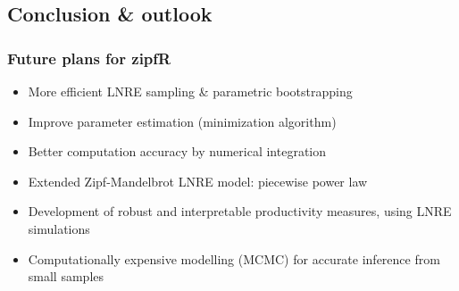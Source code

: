 \documentclass[t]{beamer} %
\begin{document}
\subsection{Conclusion \& outlook}

\begin{frame}
  \frametitle{Future plans for zipfR}

  \begin{itemize}
  \item More efficient LNRE sampling \& parametric bootstrapping
  \item Improve parameter estimation (minimization algorithm)
  \item Better computation accuracy by numerical integration
  \item Extended Zipf-Mandelbrot LNRE model: piecewise power law
  \item Development of robust and interpretable productivity measures, using LNRE simulations
  \item Computationally expensive modelling (MCMC) for accurate inference from small samples
  \end{itemize}
\end{frame}

\begin{frame}[c]
  \begin{center}
  \end{center}
\end{frame}



\end{document}
